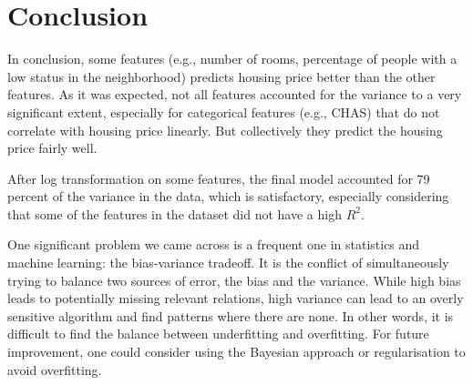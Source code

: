 \documentclass[11pt]{article}
\begin{document}
\section{Conclusion}
In conclusion, some features (e.g., number of rooms, percentage of people with a low status in the neighborhood) predicts housing price better than the other features.
As it was expected, not all features accounted for the variance to a very significant extent, especially for categorical features (e.g., CHAS) that do not correlate with housing price linearly. But collectively they predict the housing price fairly well.

After log transformation on some features, the final model accounted for 79 percent of the variance in the data, which is satisfactory, especially considering that some of the features in the dataset did not have a high $R^2$. 

One significant problem we came across is a frequent one in statistics and machine learning: the bias-variance tradeoff. It is the conflict of simultaneously trying to balance two sources of error, the bias and the variance. While high bias leads to potentially missing relevant relations, high variance can lead to an overly sensitive algorithm and find patterns where there are none. In other words, it is difficult to find the balance between underfitting and overfitting. For future improvement, one could consider using the Bayesian approach or regularisation to avoid overfitting.
\end{document}
